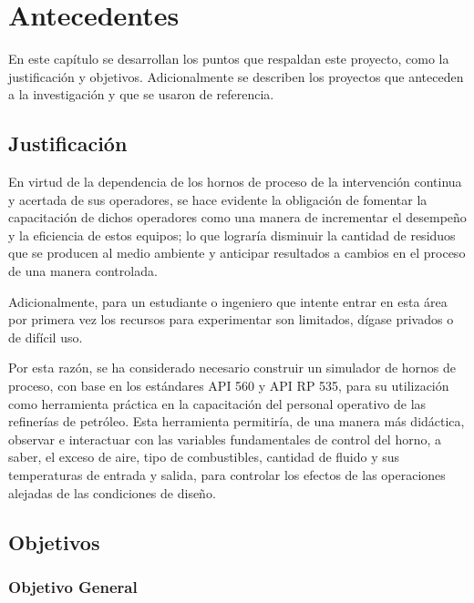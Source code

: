 \chapter{Antecedentes}

\par En este capítulo se desarrollan los puntos que respaldan este proyecto, como la justificación y objetivos. Adicionalmente se describen los proyectos que anteceden a la investigación y que se usaron de referencia.

\section{Justificación}

\par En virtud de la dependencia de los hornos de proceso de la intervención continua y acertada de sus operadores, se hace evidente la obligación de fomentar la capacitación de dichos operadores como una manera de incrementar el desempeño y la eficiencia de estos equipos; lo que lograría disminuir la cantidad de residuos que se producen al medio ambiente y anticipar resultados a cambios en el proceso de una manera controlada.

\par Adicionalmente, para un estudiante o ingeniero que intente entrar en esta área por primera vez los recursos para experimentar son limitados, dígase privados o de difícil uso.

\par Por esta razón, se ha considerado necesario construir un simulador de hornos de proceso, con base en los estándares API 560 y API RP 535, para su utilización como herramienta práctica en la capacitación del personal operativo de las refinerías de petróleo. Esta herramienta permitiría, de una manera más didáctica, observar e interactuar con las variables fundamentales de control del horno, a saber, el exceso de aire, tipo de combustibles, cantidad de fluido y sus temperaturas de entrada y salida, para controlar los efectos de las operaciones alejadas de las condiciones de diseño.

\section{Objetivos}

\subsection{Objetivo General}

